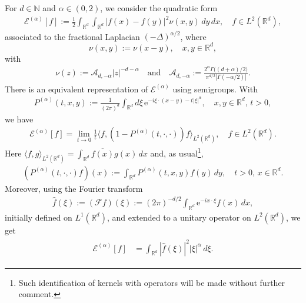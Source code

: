 \documentclass[12pt,reqno]{amsart}
\theoremstyle{definition}
\theoremstyle{remark}
\numberwithin{equation}{section}
\newcommand{\1}{\mathbbm{1}}
\newcommand{\F}{\mathcal{F}}
\newcommand{\N}{\mathbb{N}}
\newcommand{\R}{\mathbb{R}}
\def\ca{\mathcal{A}}
\def\ce{\mathcal{E}}
\newcommand{\me}[1]{\mathrm{e}^{#1}}
\begin{document}
For $d\in\N$ and $\alpha\in(0,2)$, we consider the quadratic form
\begin{align}
  \label{eq:fractlaplacesingularintegral}
  \ce^{(\alpha)}[f]
  :=\frac12\int_{\R^d}\!\int_{\R^d} 
  |f(x)-f(y)|^2\nu(x,y)
  \,dy\,dx, \quad f\in L^2(\R^d),
\end{align}\index{$\ce^{(\alpha)}$}associated to the fractional Laplacian $(-\Delta)^{\alpha/2}$, where
\begin{equation*}
  \nu(x,y) := \nu(x-y),\quad x,y\in \R^d,
\end{equation*}with
\begin{align}
  \label{eq:defaalphad}
  \nu(z):=\mathcal{A}_{d,-\alpha}|z|^{-d-\alpha}
  \quad 
  \text{and}
  \quad
  \mathcal{A}_{d,-\alpha}
  := \frac{2^{\alpha}\Gamma\big((d+\alpha)/2\big)}{\pi^{d/2}|\Gamma(-\alpha/2)|}.
\end{align}\index{$\ca_{d,-\alpha}$}There is an equivalent representation of $\ce^{(\alpha)}$ using semigroups. With
\begin{align}
  \label{eq:defusualheatkernel}
  P^{(\alpha)}(t,x,y) := \frac{1}{(2\pi)^d}\int_{\R^d}d\xi\, \me{-i\xi\cdot(x-y)-t|\xi|^\alpha} , \quad x,y\in\R^d,\,t>0,
\end{align}we have
\begin{align}
  \label{eq:fractlaplaceheatkernel}
  \ce^{(\alpha)}[f]
  = \lim_{t\to0}\frac1t\langle f,(1-P^{(\alpha)}(t,\cdot,\cdot))f\rangle_{L^2(\R^d)}, \quad f\in L^2(\R^d).
\end{align}
Here $\langle f,g\rangle_{L^2(\R^d)}=\int_{\R^d}\overline{f(x)}g(x)\,dx$ and, as usual\footnote{Such identification of kernels with operators will be made without further comment.},
\begin{align*}
  (P^{(\alpha)}(t,\cdot,\cdot)f)(x) := \int_{\R^d} P^{(\alpha)}(t,x,y)f(y)\,dy, \quad t>0,\,x\in\R^d.
\end{align*}
Moreover, using the Fourier transform
\begin{align*}
  \hat f(\xi):=(\F f)(\xi):=(2\pi)^{-d/2}\int_{\R^d}\me{-ix\cdot\xi}f(x)\,dx,
\end{align*}\index{$\F$}initially defined on $L^1(\R^d)$, and extended to a unitary operator on $L^2(\R^d)$, we get
\begin{align}
  \label{eq:dirichletformalpha}
  \begin{split}
    \ce^{(\alpha)}[f]
    & = \int_{\R^d} |\hat f(\xi)|^2|\xi|^\alpha\,d\xi.
  \end{split}
\end{align}
\end{document}
